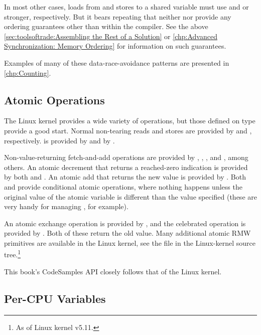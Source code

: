 In most other cases, loads from and stores to a shared variable must
use  and  or stronger, respectively.
But it bears repeating that neither  nor 
provide any ordering guarantees other than within the compiler.
See the above
\cref{sec:toolsoftrade:Assembling the Rest of a Solution} or
\cref{chp:Advanced Synchronization: Memory Ordering}
for information on such guarantees.

Examples of many of these data-race-avoidance patterns are presented in
\cref{chp:Counting}.

\subsection{Atomic Operations}
\label{sec:toolsoftrade:Atomic Operations}

The Linux kernel provides a wide variety of  operations, but
those defined on type  provide a good start.
Normal non-tearing reads and stores are provided by
 and , respectively.
 is provided by  and
 by .

Non-value-returning fetch-and-add operations are provided by
, , , and
, among others.
An atomic decrement that returns a reached-zero indication is provided
by both  and .
An atomic add that returns the new value is provided by
.
Both  and  provide
conditional atomic operations, where nothing happens unless the
original value of the atomic variable is different than the value
specified (these are very handy for managing
, for example).

An atomic exchange operation is provided by , and
the celebrated  operation is provided by
.
Both of these return the old value.
Many additional atomic RMW primitives are available in the Linux kernel,
see the  file in the Linux-kernel
source tree.\footnote{
	As of Linux kernel v5.11.
}

This book's CodeSamples API closely follows that of the Linux kernel.

\subsection{Per-CPU Variables}
\label{sec:toolsoftrade:Per-CPU Variables}

